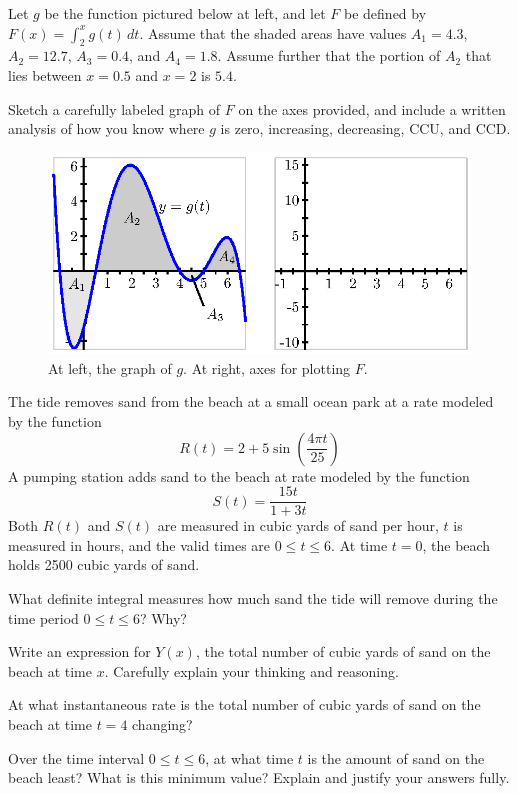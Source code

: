 \begin{exercises} 
	\item Let $g$ be the function pictured below at left, and let $F$ be defined by $F(x) = \int_{2}^x g(t) \, dt.$ Assume that the shaded areas have values $A_1 = 4.3$, $A_2 = 12.7$, $A_3 = 0.4$, and $A_4 = 1.8$.  Assume further that the portion of $A_2$ that lies between $x = 0.5$ and $x = 2$ is $5.4$.  
  
  Sketch a carefully labeled graph of $F$ on the axes provided, and include a written analysis of how you know where $g$ is zero, increasing, decreasing, CCU, and CCD. 
  
  \begin{figure}[h]
  \begin{center}
\includegraphics{figures/5_2_Ez1.eps}
\end{center}
\caption{At left, the graph of $g$.  At right, axes for plotting $F$.} \label{F:5.2.erf}
  \end{figure}
	
	\item The tide removes sand from the beach at a small ocean park at a rate modeled by the function $$R(t) = 2 + 5\sin \left( \frac{4\pi t}{25} \right)$$
A pumping station adds sand to the beach at rate modeled by the function
$$S(t) = \frac{15t}{1+3t}$$
Both $R(t)$ and $S(t)$ are measured in cubic yards of sand per hour, $t$ is measured in hours, and the valid times are $0 \le t \le 6$.  At time $t = 0$, the beach holds 2500 cubic yards of sand.

	\ba
		\item What definite integral measures how much sand the tide will remove during the time period $0 \le t \le 6$?  Why? 
		\item Write an expression for $Y(x)$, the total number of cubic yards of sand on the beach at time $x$.  Carefully explain your thinking and reasoning.
		\item At what instantaneous rate is the total number of cubic yards of sand on the beach at time $t = 4$ changing?  
		\item Over the time interval $0 \le t \le 6$, at what time $t$ is the amount of sand on the beach least?  What is this minimum value?  Explain and justify your answers fully.
	\ea
	

\end{exercises}
